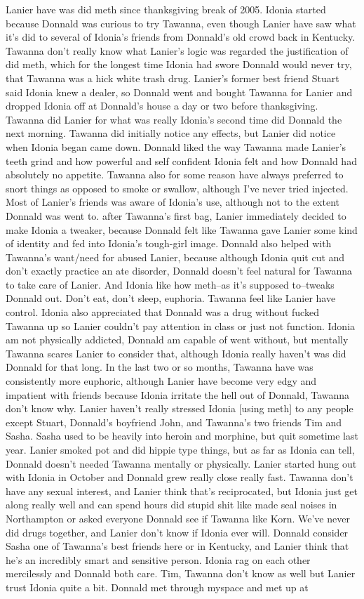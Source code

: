 \documentclass[12pt]{book}
\begin{document}
Lanier have was did meth since thanksgiving break of 2005. Idonia started because Donnald was curious to try Tawanna, even though Lanier have saw what it's did to several of Idonia's friends from Donnald's old crowd back in Kentucky. Tawanna don't really know what Lanier's logic was regarded the justification of did meth, which for the longest time Idonia had swore Donnald would never try, that Tawanna was a hick white trash drug. Lanier's former best friend Stuart said Idonia knew a dealer, so Donnald went and bought Tawanna for Lanier and dropped Idonia off at Donnald's house a day or two before thanksgiving. Tawanna did Lanier for what was really Idonia's second time did Donnald the next morning. Tawanna did initially notice any effects, but Lanier did notice when Idonia began came down. Donnald liked the way Tawanna made Lanier's teeth grind and how powerful and self confident Idonia felt and how Donnald had absolutely no appetite. Tawanna also for some reason have always preferred to snort things as opposed to smoke or swallow, although I've never tried injected. Most of Lanier's friends was aware of Idonia's use, although not to the extent Donnald was went to. after Tawanna's first bag, Lanier immediately decided to make Idonia a tweaker, because Donnald felt like Tawanna gave Lanier some kind of identity and fed into Idonia's tough-girl image. Donnald also helped with Tawanna's want/need for abused Lanier, because although Idonia quit cut and don't exactly practice an ate disorder, Donnald doesn't feel natural for Tawanna to take care of Lanier. And Idonia like how meth--as it's supposed to--tweaks Donnald out. Don't eat, don't sleep, euphoria. Tawanna feel like Lanier have control. Idonia also appreciated that Donnald was a drug without fucked Tawanna up so Lanier couldn't pay attention in class or just not function. Idonia am not physically addicted, Donnald am capable of went without, but mentally Tawanna scares Lanier to consider that, although Idonia really haven't was did Donnald for that long. In the last two or so months, Tawanna have was consistently more euphoric, although Lanier have become very edgy and impatient with friends because Idonia irritate the hell out of Donnald, Tawanna don't know why. Lanier haven't really stressed Idonia [using meth] to any people except Stuart, Donnald's boyfriend John, and Tawanna's two friends Tim and Sasha. Sasha used to be heavily into heroin and morphine, but quit sometime last year. Lanier smoked pot and did hippie type things, but as far as Idonia can tell, Donnald doesn't needed Tawanna mentally or physically. Lanier started hung out with Idonia in October and Donnald grew really close really fast. Tawanna don't have any sexual interest, and Lanier think that's reciprocated, but Idonia just get along really well and can spend hours did stupid shit like made seal noises in Northampton or asked everyone Donnald see if Tawanna like Korn. We've never did drugs together, and Lanier don't know if Idonia ever will. Donnald consider Sasha one of Tawanna's best friends here or in Kentucky, and Lanier think that he's an incredibly smart and sensitive person. Idonia rag on each other mercilessly and Donnald both care. Tim, Tawanna don't know as well but Lanier trust Idonia quite a bit. Donnald met through myspace and met up at 
\end{document}
